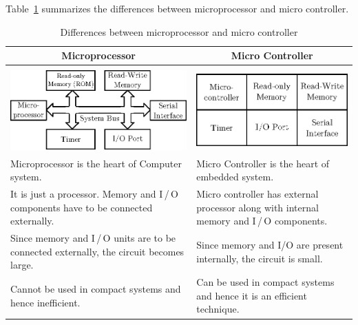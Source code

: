 Table~\ref{tab7.2} summarizes the differences between microprocessor and micro controller.
{\fontsize{10pt}{12pt}\selectfont
\begin{longtable}{|p{6.8cm}|p{6.8cm}|}
\caption{Differences between microprocessor and micro controller}\label{tab7.2}\\
\hline
\multicolumn{1}{|c|}{\bf Microprocessor} & \multicolumn{1}{c|}{\bf Micro Controller}\\
\hline
&\\[-2pt]
\multicolumn{1}{|c|}{\includegraphics[scale=.87]{chap7/tab7.1a.eps}} & \multicolumn{1}{c|}{\includegraphics[scale=.87]{chap7/tab7.1b.eps}}\\[4pt]
\hline
Microprocessor is the heart of Computer system. & Micro Controller is the heart of embedded system.\\
\hline
It is just a processor. Memory and I\,/\,O components have to be connected externally. & Micro controller has external processor along with internal memory and I\,/\,O components.\\
\hline
Since memory and I\,/\,O units are to be connected externally, the circuit becomes large. & Since memory and I/O are present internally, the circuit is small.\\
\hline
Cannot be used in compact systems and hence inefficient. & Can be used in compact systems and hence it is an efficient technique.\\

\end{longtable}}
